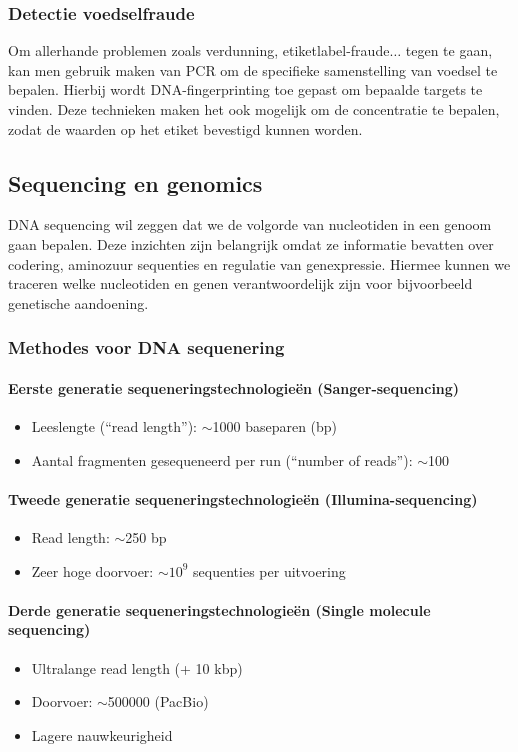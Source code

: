 \documentclass[a4paper,kul]{kulakarticle} %
\begin{document}
\subsubsection{Detectie voedselfraude}
Om allerhande problemen zoals verdunning, etiketlabel-fraude$\ldots$ tegen te gaan, kan men gebruik maken van PCR om de specifieke samenstelling van voedsel te bepalen. Hierbij wordt DNA-fingerprinting toe gepast om bepaalde targets te vinden. Deze technieken maken het ook mogelijk om de concentratie te bepalen, zodat de waarden op het etiket bevestigd kunnen worden. 
\subsection{Sequencing en genomics}
DNA sequencing wil zeggen dat we de volgorde van nucleotiden in een genoom gaan bepalen. Deze inzichten zijn belangrijk omdat ze informatie bevatten over codering, aminozuur sequenties en regulatie van genexpressie. Hiermee kunnen we traceren welke nucleotiden en genen verantwoordelijk zijn voor bijvoorbeeld genetische aandoening.
\subsubsection{Methodes voor DNA sequenering}
\paragraph{Eerste generatie sequeneringstechnologieën (Sanger-sequencing)}
\begin{itemize}
	\item Leeslengte (“read length”): $\sim$1000 baseparen (bp)
	\item Aantal fragmenten gesequeneerd per run (“number of reads”): $\sim$100
\end{itemize}
\paragraph{Tweede generatie sequeneringstechnologieën (Illumina-sequencing)}
\begin{itemize}
	\item Read length: $\sim$250 bp
	\item Zeer hoge doorvoer: $\sim$$10^9$ sequenties per uitvoering
\end{itemize}
\paragraph{Derde generatie sequeneringstechnologieën (Single molecule sequencing)}
\begin{itemize}
	\item Ultralange read length (+ 10 kbp)
	\item Doorvoer: $\sim$\num{500000} (PacBio)
	\item Lagere nauwkeurigheid
\end{itemize}
\end{document}
